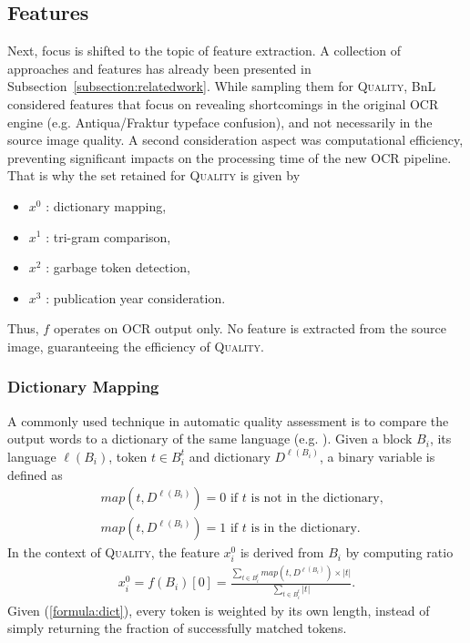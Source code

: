 \documentclass{jdmdh}
\begin{document}
\subsection{Features} \label{subsection:features}
Next, focus is shifted to the topic of feature extraction. A collection of approaches and features has already been presented in Subsection~\ref{subsection:relatedwork}. While sampling them for \textsc{Quality}, BnL considered features that focus on revealing shortcomings in the original OCR engine (e.g. Antiqua/Fraktur typeface confusion), and not necessarily in the source image quality. A second consideration aspect was computational efficiency, preventing significant impacts on the processing time of the new OCR pipeline.
That is why the set retained for \textsc{Quality} is given by \\
\begin{itemize}
    \item $x^0$ : dictionary mapping,
    \item $x^1$ : tri-gram comparison,
    \item $x^2$ : garbage token detection,
    \item $x^3$ : publication year consideration. \\
\end{itemize}
Thus, $f$ operates on OCR output only. No feature is extracted from the source image, guaranteeing the efficiency of \textsc{Quality}.
\subsubsection{Dictionary Mapping}
A commonly used technique in automatic quality assessment is to compare the output words to a dictionary of the same language (e.g. \citet{alex}). Given a block $B_i$, its language $\ell(B_i)$, token $t\!\in\!B_i^t$ and dictionary $D^{\ell(B_i)}$, a binary variable is defined as \\
\begin{align}
    &map(t, D^{\ell(B_i)}) = 0\text{ if $t$ is not in the dictionary,} \nonumber \\
    &map(t, D^{\ell(B_i)}) = 1\text{ if $t$ is in the dictionary.}
\end{align}
In the context of \textsc{Quality}, the feature $x_i^0$ is derived from $B_i$ by computing ratio
\begin{align}
    x_i^0 = f(B_i)[0] = \frac{\sum_{t\in B_i^t}map(t, D^{\ell(B_i)})\times |t| }{\sum_{t\in B_i^t}|t|}. \label{formula:dict}
\end{align}
Given (\ref{formula:dict}), every token is weighted by its own length, instead of simply returning the fraction of successfully matched tokens.
\end{document}

